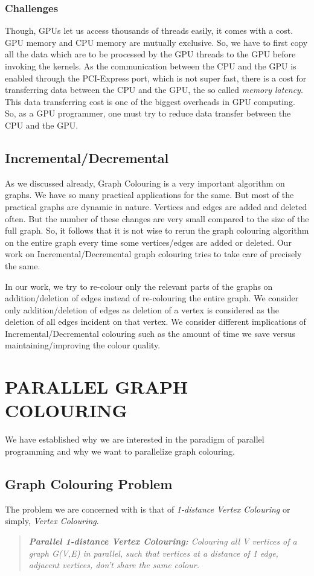 \documentclass[MTech]{iitmdiss}
\begin{document}
\subsection{Challenges}
Though, GPUs let us access thousands of threads easily, it comes with a cost. GPU memory and CPU memory are mutually exclusive. So, we have to first copy all the data which are to be processed by the GPU threads to the GPU before invoking the kernels. As the communication between the CPU and the GPU is enabled through the PCI-Express port, which is not super fast, there is a cost for transferring data between the CPU and the GPU, the so called \textit{memory latency}. This data transferring cost is one of the biggest overheads in GPU computing. So, as a GPU programmer, one must try to reduce data transfer between the CPU and the GPU.  
\section{Incremental/Decremental}
As we discussed already, Graph Colouring is a very important algorithm on graphs. We have so many practical applications for the same. But most of the practical graphs are dynamic in nature. Vertices and edges are added and deleted often. But the number of these changes are very small compared to the size of the full graph. So, it follows that it is not wise to rerun the graph colouring algorithm on the entire graph every time some vertices/edges are added or deleted. Our work on Incremental/Decremental graph colouring tries to take care of precisely the same.

In our work, we try to re-colour only the relevant parts of the graphs on addition/deletion of edges instead of re-colouring the entire graph. We consider only addition/deletion of edges as deletion of a vertex is considered as the deletion of all edges incident on that vertex. We consider different implications of Incremental/Decremental colouring such as the amount of time we save versus maintaining/improving the colour quality.

\chapter{PARALLEL GRAPH COLOURING}
We have established why we are interested in the paradigm of parallel programming and why we want to parallelize graph colouring.
\section{Graph Colouring Problem}
The problem we are concerned with is that of \textit{1-distance Vertex Colouring} or simply, \textit{Vertex Colouring}.
\begin{verse}
\textit{\textbf{Parallel 1-distance Vertex Colouring:} Colouring all \textit{V} vertices of a graph \textit{G(V,E)} in parallel, such that vertices at a distance of 1 edge, adjacent vertices, don't share the same colour.}
\end{verse}
\end{document}
